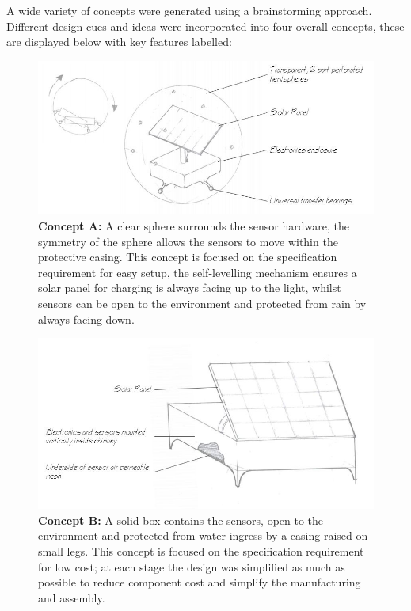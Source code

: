 A wide variety of concepts were generated using a brainstorming approach. Different design cues and ideas were incorporated into four overall concepts, these are displayed below with key features labelled:


\begin{figure}[H]
\centering
\includegraphics[width=0.6\linewidth]{Engineering_hardware/Engineering_hardware_Figures/Concept_ball.JPG}
\caption{\textbf{Concept A:} A clear sphere surrounds the sensor hardware, the symmetry of the sphere allows the sensors to move within the protective casing. This concept is focused on the specification requirement for easy setup, the self-levelling mechanism ensures a solar panel for charging is always facing up to the light, whilst sensors can be open to the environment and protected from rain by always facing down. }
\label{fig:concept_A}
\end{figure}

\begin{figure}[H]
\centering
\includegraphics[width=0.6\linewidth]{Engineering_hardware/Engineering_hardware_Figures/Concept_box.JPG}
\caption{\textbf{Concept B:} A solid box contains the sensors, open to the environment and protected from water ingress by a casing raised on small legs. This concept is focused on the specification requirement for low cost; at each stage the design was simplified as much as possible to reduce component cost and simplify the manufacturing and assembly.}
\label{fig:concept_B}
\end{figure}


